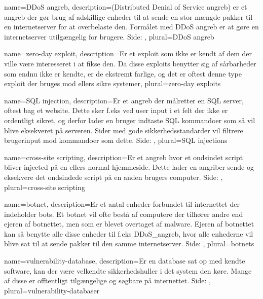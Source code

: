 \makeglossaries

{
    name={DDoS angreb},
    description={(Distributed Denial of Service angreb) er et angreb der gør brug af adskillige enheder til at sende en stor mængde pakker til en internetserver for at overbelaste den. Formålet med DDoS angreb er at gøre en internetserver utilgængelig for brugere.  Side: },
    plural={DDoS angreb}
}

{
    name={zero-day exploit},
    description={Er et exploit som ikke er kendt af dem der ville være interesseret i at fikse den. Da disse exploits benytter sig af sårbarheder som endnu ikke er kendte, er de ekstremt farlige, og det er oftest denne type exploit der bruges mod ellers sikre systemer},
    plural={zero-day exploits}
}

{
    name={SQL injection},
    description={Er et angreb der målretter en SQL server, oftest bag et website. Dette sker f.eks ved user input i et felt der ikke er ordentligt sikret, og derfor lader en bruger indtaste SQL kommandoer som så vil blive eksekveret på serveren. Sider med gode sikkerhedsstandarder vil filtrere brugerinput mod kommandoer som dette.  Side: },
    plural={SQL injections}
}

{
    name={cross-site scripting},
    description={Er et angreb hvor et ondsindet script bliver injected på en ellers normal hjemmeside. Dette lader en angriber sende og eksekvere det ondsindede script på en anden brugers computer. Side: },
    plural={cross-site scripting}
}

{
    name={botnet},
    description={Er et antal enheder forbundet til internettet der indeholder bots. Et botnet vil ofte bestå af computere der tilhører andre end ejeren af botnettet, men som er blevet overtaget af malware. Ejeren af botnettet kan så benytte alle disse enheder til f.eks \Gls{DDoS_angreb}, hvor alle enhederne vil blive sat til at sende pakker til den samme internetserver. Side: }, 
    plural={botnets}
}

{
    name={vulnerability-database},
    description={Er en database sat op med kendte software, kan der være velkendte sikkerhedshuller i det system den køre. Mange af disse er offtentligt tilgængelige og søgbare på internettet.  Side: }, 
    plural={vulnerability-databaser}
}